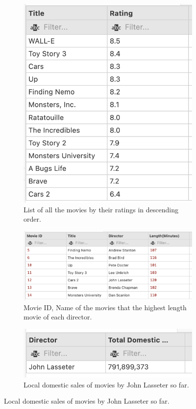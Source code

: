 \begin{figure}[H]
    \begin{subfigure}{.5\textwidth}
        \centering
        \includegraphics[width=.8\linewidth]{images/output/q7.png}
        \caption*{List of all the movies by their ratings in descending order.}
        \label{fig:q7}
    \end{subfigure}
    \begin{subfigure}{.5\textwidth}
        \centering
        \includegraphics[width=.8\linewidth]{images/output/q8.png}
        \caption*{Movie ID, Name of the movies that the highest length movie of each director.}
        \label{fig:q8}
    \end{subfigure}
    \begin{subfigure}{\textwidth}
        \centering
        \includegraphics[width=.66\linewidth]{images/output/q9.png}
        \caption*{Local domestic sales of movies by John Lasseter so far.}
        \label{fig:q9}
    \end{subfigure}
\end{figure}
